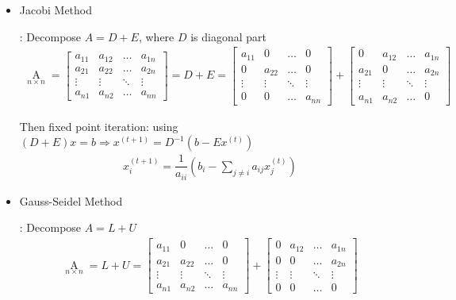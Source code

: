 \begin{itemize}[topsep=2pt,itemsep=0pt]
    \item \hypertarget{JacobiMethod}{Jacobi Method}: Decompose $ A=D+E $, where $ D $ is diagonal part
    \begin{align}
        \mathop{A}\limits_{n\times n} =
        \begin{bmatrix}
        a_{11}&a_{12}&\ldots&a_{1n}\\
        a_{21}&a_{22}&\ldots&a_{2n}\\
        \vdots&\vdots&\ddots&\vdots\\
        a_{n1}&a_{n2}&\ldots&a_{nn}
        \end{bmatrix}=D+E=
        \begin{bmatrix}
        a_{11}&0&\ldots &0\\
        0&a_{22}&\ldots &0\\
        \vdots&\vdots&\ddots&\vdots\\
        0&0&\ldots&a_{nn}
        \end{bmatrix}+
        \begin{bmatrix}
        0&a_{12}&\ldots&a_{1n}\\
        a_{21}&0&\ldots&a_{2n}\\
        \vdots&\vdots&\ddots&\vdots\\
        a_{n1}&a_{n2}&\ldots&0
        \end{bmatrix}
    \end{align}
    
    Then fixed point iteration: using $ (D+E)x=b \Rightarrow x^{(t+1)}=D^{-1}(b-Ex^{(t)})$
    \begin{align}
        x_i^{(t+1)}=\dfrac{1}{a_{ii}}\left(b_i-\sum_{j\neq i}a_{ij}x_j^{(t)}\right)
    \end{align}
    
    \item \hypertarget{GaussSeidelMethod}{Gauss-Seidel Method}: Decompose $ A=L+U $
    \begin{align}
        \mathop{A}\limits_{n\times n} =L+U=
        \begin{bmatrix}
        a_{11}&0&\ldots &0\\
        a_{21}&a_{22}&\ldots &0\\
        \vdots&\vdots&\ddots&\vdots\\
        a_{n1}&a_{n2}&\ldots&a_{nn}
        \end{bmatrix}
        +\begin{bmatrix}
        0&a_{12}&\ldots&a_{1n}\\
        0&0&\ldots&a_{2n}\\
        \vdots&\vdots&\ddots&\vdots\\
        0&0&\ldots&0
        \end{bmatrix}
    \end{align}


\end{itemize}
